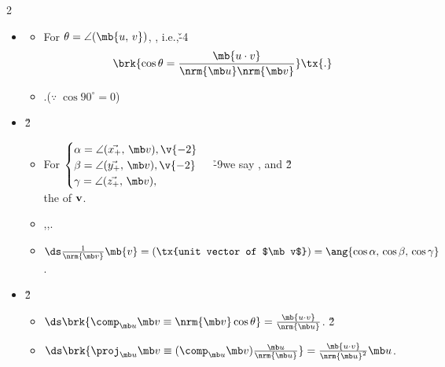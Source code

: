 \documentclass[dvipdfmx,a4paper,titlepage,9pt]{jsarticle}
\begin{document}
\begin{multicols*}{2}
\begin{itemize}[label={-}]
\item{}
\begin{itemize}[label=$\cdot$]
\setlength{\leftskip}{-5pt}
\item For $\theta=\angle(\mb{u,\,v})$, , i.e.,\v{-4}
$$\brk{\cos\theta=\frac{\mb{u\cdot v}}{\nrm{\mb u}\nrm{\mb v}}}\tx{.}$$
\item {}.\quad($\because\;\cos 90^\circ=0$) \\
\end{itemize}

\item{}\v2
\begin{itemize}[label=$\cdot$]
\setlength{\leftskip}{-5pt}
\item For $\begin{cases}\alpha=\angle(\Vec{x_+},\,\mb v),\v{-2}\\
                        \beta=\angle(\Vec{y_+},\,\mb v), \v{-2}\\
	                        \gamma=\angle(\Vec{z_+},\,\mb v),\end{cases}$ \h{-9}we say \brk{$\cos\alpha$}, \brk{$\cos\beta$} and \brk{$\cos\gamma$} \v2\\
  the  of $\bf v$. \\

\item {},\;\;,\;\;. \\

\item $\ds\frac1{\nrm{\mb v}}\mb{v}=(\tx{unit vector of $\mb v$})=\ang{\cos\alpha,\,\cos\beta,\,\cos\gamma}$.
\end{itemize}
\vfill\null\columnbreak

\item{}\v2
\begin{itemize}[label=$\cdot$]
\setlength{\leftskip}{-5pt}
\item $\ds\brk{\comp_{\mb u}\mb v\equiv\nrm{\mb v}\cos\theta}=\frac{\mb{u\cdot v}}{\nrm{\mb u}}$. \v2
\item $\ds\brk{\proj_{\mb u}\mb v\equiv(\comp_{\mb u}\mb v)\frac{\mb u}{\nrm{\mb u}}}=\frac{\mb{u\cdot v}}{\nrm{\mb u}^2}\mb u$. \\
\end{itemize}


\end{itemize}
\end{multicols*}
\end{document}
